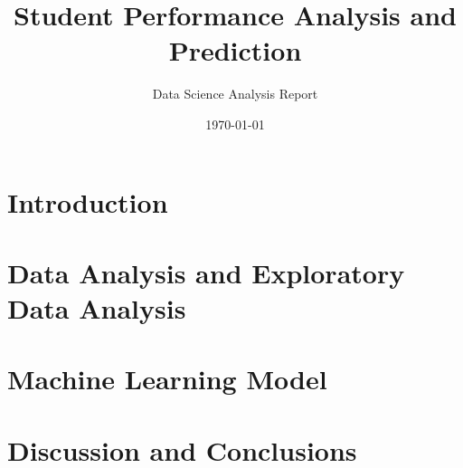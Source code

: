 \documentclass[12pt,a4paper]{report}
\title{Student Performance Analysis and Prediction}
\author{Data Science Analysis Report}
\date{\today}
\begin{document}
\maketitle
\tableofcontents

\chapter{Introduction}


\chapter{Data Analysis and Exploratory Data Analysis}


\chapter{Machine Learning Model}


\chapter{Discussion and Conclusions}

\end{document}
